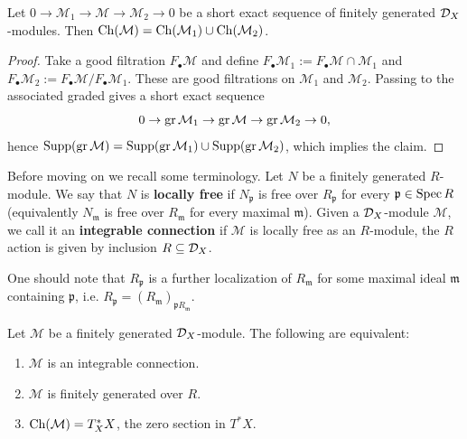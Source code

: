 \begin{proposition}\label{prop:charvar-union}
    Let $0\to \mathcal M_1\to \mathcal M\to \mathcal M_2\to 0$ be a short exact sequence of finitely
    generated $\mathcal{D}_X$-modules. Then $\operatorname{Ch}(\mathcal M)=\operatorname{Ch}(\mathcal M_1)\cup \operatorname{Ch}(\mathcal M_2)$.
\end{proposition}
\begin{proof}
    Take a good filtration $F_\bullet\mathcal M$ and define $F_\bullet\mathcal M_1:=F_\bullet\mathcal M
        \cap \mathcal M_1$ and $F_\bullet\mathcal M_2:=F_\bullet\mathcal M/F_\bullet\mathcal M_1$. These
    are good filtrations on $\mathcal M_1$ and $\mathcal M_2$. Passing to the associated graded gives a
    short exact sequence
    \[
        0\to \operatorname{gr} \mathcal M_1\to \operatorname{gr} \mathcal M\to \operatorname{gr} \mathcal M_2\to 0,
    \]
    hence
    $\operatorname{Supp}(\operatorname{gr} \mathcal M)=\operatorname{Supp}(\operatorname{gr} \mathcal M_1)\cup \operatorname{Supp}(\operatorname{gr} \mathcal M_2)$, which implies the
    claim.
\end{proof}

Before moving on we recall some terminology. Let $N$ be a finitely generated $R$-module. We say that
$N$ is \textbf{locally free} if $N_{\mathfrak p}$ is free over $R_{\mathfrak p}$ for every
$\mathfrak p\in\operatorname{Spec} R$ (equivalently $N_{\mathfrak m}$ is free over $R_{\mathfrak m}$ for every
maximal $\mathfrak m$). Given a $\mathcal{D}_X$-module $\mathcal M$, we call it an \textbf{integrable connection} \label{def:integrable-connection}
if $\mathcal M$ is locally free as an $R$-module, the $R$ action is given by inclusion $R\subseteq \mathcal{D}_X$.

\begin{remark}
    One should note that $R_{\mathfrak{p}}$ is a further localization of $R_{\mathfrak{m}}$ for some maximal ideal $\mathfrak{m}$ containing $\mathfrak{p}$, i.e.
    $R_{\mathfrak{p}} = (R_{\mathfrak{m}})_{\mathfrak{p}R_{\mathfrak{m}}}$.
\end{remark}

\begin{proposition}\label{prop:integrable-connection-characterizations}
    Let $\mathcal{M}$ be a finitely generated $\mathcal{D}_X$-module. The following are equivalent:
    \begin{enumerate}
        \item $\mathcal{M}$ is an integrable connection.
        \item $\mathcal{M}$ is finitely generated over $R$.
        \item $\operatorname{Ch}(\mathcal{M}) = T_X^* X$, the zero section in $T^* X$.
    \end{enumerate}
\end{proposition}


